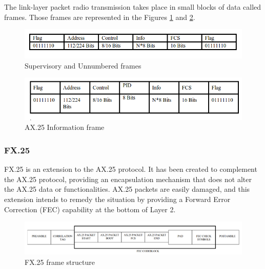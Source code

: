 The link-layer packet radio transmission takes place in small blocks of data called frames. Those frames are represented in the Figures \ref{f2.7} and \ref{f2.8}.\\

 \begin{figure}[H]
\centerline{\includegraphics[width=1\textwidth]{images/ax25a.png}}
\caption{Supervisory and Unnumbered frames \cite{AX25}}
\label{f2.7}
\end{figure}

\begin{figure}[H]
\centerline{\includegraphics[width=1\textwidth]{images/ax25b.png}}
\caption{AX.25 Information frame \cite{AX25}}
\label{f2.8}
\end{figure}

\subsubsection{FX.25}
FX.25 is an extension to the AX.25 protocol. It has been created to complement the AX.25 protocol, providing an encapsulation mechanism that does not alter the AX.25 data or functionalities. AX.25 packets are easily damaged, and this extension intends to remedy the situation by providing a Forward Error Correction (FEC) capability at the bottom of Layer 2.

\begin{figure}[H]
\centerline{\includegraphics[width=1\textwidth]{images/fx25.png}}
\caption{FX.25 frame structure \cite{FX25}}
\label{f3.5}
\end{figure}

\newpage

\newpage
